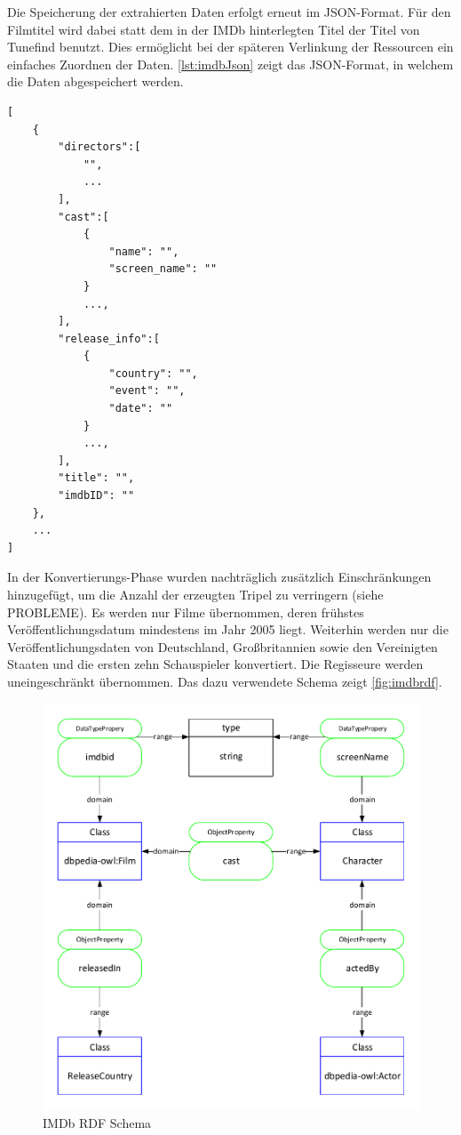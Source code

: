 \documentclass[parskip]{scrartcl}
\begin{document}
Die Speicherung der extrahierten Daten erfolgt erneut im JSON-Format. Für den Filmtitel wird dabei statt dem in der IMDb hinterlegten Titel der Titel von Tunefind benutzt. Dies ermöglicht bei der späteren Verlinkung der Ressourcen ein einfaches Zuordnen der Daten. \autoref{lst:imdbJson} zeigt das JSON-Format, in welchem die Daten abgespeichert werden.

\begin{lstlisting}[caption={IMDb JSON-Format}, label={lst:imdbJson}]
[  
    {  
        "directors":[  
            "",
            ...
        ],
        "cast":[
            {
                "name": "",
                "screen_name": ""
            }
            ...,
        ],
        "release_info":[
            {
                "country": "",
                "event": "",
                "date": ""
            }
            ...,
        ],
        "title": "",
        "imdbID": ""
    },
    ...
]
\end{lstlisting}

In der Konvertierungs-Phase wurden nachträglich zusätzlich Einschränkungen hinzugefügt, um die Anzahl der erzeugten Tripel zu verringern (siehe PROBLEME). Es werden nur Filme übernommen, deren frühstes Veröffentlichungsdatum mindestens im Jahr 2005 liegt. Weiterhin werden nur die Veröffentlichungsdaten von Deutschland, Großbritannien sowie den Vereinigten Staaten und die ersten zehn Schauspieler konvertiert. Die Regisseure werden uneingeschränkt übernommen. Das dazu verwendete Schema zeigt \autoref{fig:imdbrdf}.

\begin{figure}[H]
    \centering
    \includegraphics[scale=0.8]{imdb}
    \caption{IMDb RDF Schema}
    \label{fig:imdbrdf}
\end{figure}
\end{document}
